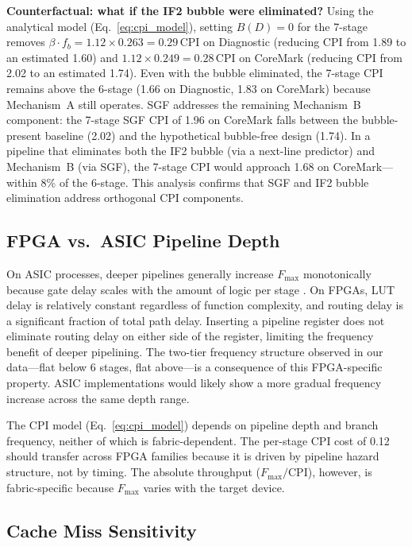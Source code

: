\documentclass[journal]{IEEEtran}
\begin{document}
\begin{table}[t]
\begin{table}[t]
\begin{table}[t]
\begin{table}[t]
\begin{table}[t]
\begin{table}[t]
\begin{table}[t]
\textbf{Counterfactual: what if the IF2 bubble were eliminated?} Using the analytical model (Eq.~\ref{eq:cpi_model}), setting $B(D) = 0$ for the 7-stage removes $\beta \cdot f_b = 1.12 \times 0.263 = 0.29$\,CPI on Diagnostic (reducing CPI from 1.89 to an estimated 1.60) and $1.12 \times 0.249 = 0.28$\,CPI on CoreMark (reducing CPI from 2.02 to an estimated 1.74). Even with the bubble eliminated, the 7-stage CPI remains above the 6-stage (1.66 on Diagnostic, 1.83 on CoreMark) because Mechanism~A still operates. SGF addresses the remaining Mechanism~B component: the 7-stage SGF CPI of 1.96 on CoreMark falls between the bubble-present baseline (2.02) and the hypothetical bubble-free design (1.74). In a pipeline that eliminates both the IF2 bubble (via a next-line predictor) and Mechanism~B (via SGF), the 7-stage CPI would approach 1.68 on CoreMark---within 8\% of the 6-stage. This analysis confirms that SGF and IF2 bubble elimination address orthogonal CPI components.

\subsection{FPGA vs.\ ASIC Pipeline Depth}

On ASIC processes, deeper pipelines generally increase $F_{\max}$ monotonically because gate delay scales with the amount of logic per stage \cite{hrishikesh2002optimal, sprangle2002increasing}. On FPGAs, LUT delay is relatively constant regardless of function complexity, and routing delay is a significant fraction of total path delay. Inserting a pipeline register does not eliminate routing delay on either side of the register, limiting the frequency benefit of deeper pipelining. The two-tier frequency structure observed in our data---flat below 6 stages, flat above---is a consequence of this FPGA-specific property. ASIC implementations would likely show a more gradual frequency increase across the same depth range.

The CPI model (Eq.~\ref{eq:cpi_model}) depends on pipeline depth and branch frequency, neither of which is fabric-dependent. The per-stage CPI cost of 0.12 should transfer across FPGA families because it is driven by pipeline hazard structure, not by timing. The absolute throughput ($F_{\max} / \text{CPI}$), however, is fabric-specific because $F_{\max}$ varies with the target device.

\subsection{Cache Miss Sensitivity}
\label{sec:cache_miss}


\end{table}
\end{table}
\end{table}
\end{table}
\end{table}
\end{table}
\end{table}
\end{document}
